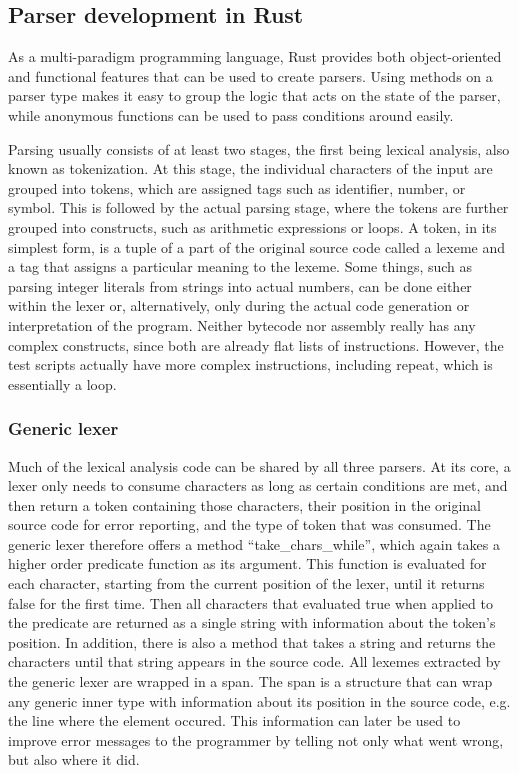 \subsection{Parser development in Rust} \label{parser-dev}
As a multi-paradigm programming language, Rust provides both object-oriented and functional features that can be used to create parsers.
Using methods on a parser type makes it easy to group the logic that acts on the state of the parser, while anonymous functions can be used to pass conditions around easily.

Parsing usually consists of at least two stages, the first being lexical analysis, also known as tokenization.
At this stage, the individual characters of the input are grouped into tokens, which are assigned tags such as identifier, number, or symbol.
This is followed by the actual parsing stage, where the tokens are further grouped into constructs, such as arithmetic expressions or loops.
A token, in its simplest form, is a tuple of a part of the original source code called a lexeme and a tag that assigns a particular meaning to the lexeme. Some things, such as parsing integer literals from strings into actual numbers, can be done either within the lexer or, alternatively, only during the actual code generation or interpretation of the program.
Neither bytecode nor assembly really has any complex constructs, since both are already flat lists of instructions.
However, the test scripts actually have more complex instructions, including repeat, which is essentially a loop.

\subsubsection{Generic lexer}
Much of the lexical analysis code can be shared by all three parsers. At its core, a lexer only needs to consume characters as long as certain conditions are met, and then return a token containing those characters, their position in the original source code for error reporting, and the type of token that was consumed.
The generic lexer therefore offers a method ``take\_chars\_while'', which again takes a higher order predicate function as its argument. This function is evaluated for each character, starting from the current position of the lexer, until it returns false for the first time. Then all characters that evaluated true when applied to the predicate are returned as a single string with information about the token's position.
In addition, there is also a method that takes a string and returns the characters until that string appears in the source code.
\label{spans}
All lexemes extracted by the generic lexer are wrapped in a span. The span is a structure that can wrap any generic inner type with information about its position in the source code, e.g. the line where the element occured.
This information can later be used to improve error messages to the programmer by telling not only what went wrong, but also where it did.

